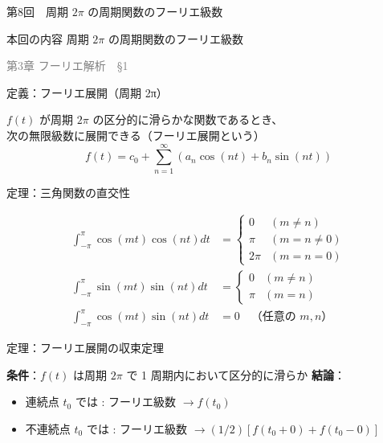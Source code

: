 \documentclass[professionalfonts]{beamer}
\begin{document}
\begin{frame}{第8回　周期 $2\pi$ の周期関数のフーリエ級数}
  \begin{block}{本回の内容}
  周期 $2\pi$ の周期関数のフーリエ級数
  \end{block}
  \vfill\hfill{\scriptsize \textcolor{gray}{第3章 フーリエ解析　§1}}
\end{frame}

\begin{frame}{定義：フーリエ展開（周期 2π）}
  \begin{block}{}
  $f(t)$ が周期 $2\pi$ の区分的に滑らかな関数であるとき、\\[2pt]
  次の無限級数に展開できる（フーリエ展開という）\\[2pt]
  \[
    f(t) = c_{0} + \sum_{n=1}^\infty (a_{n}\cos(nt) + b_{n}\sin(nt))
  \]
  \end{block}
\end{frame}

\begin{frame}{定理：三角関数の直交性}
  \begin{block}{}
  \begin{align*}
    \int_{-\pi}^{\pi} \cos(mt)\cos(nt) dt &= \begin{cases} 0 & (m \neq n) \\ \pi & (m = n \neq 0) \\ 2\pi & (m = n = 0) \end{cases} \\
    \int_{-\pi}^{\pi} \sin(mt)\sin(nt) dt &= \begin{cases} 0 & (m \neq n) \\ \pi & (m = n) \end{cases} \\
    \int_{-\pi}^{\pi} \cos(mt)\sin(nt) dt &= 0 \quad \text{（任意の $m, n$）}
  \end{align*}
  \end{block}
\end{frame}

\begin{frame}{定理：フーリエ展開の収束定理}
  \begin{block}{}
  \textbf{条件}：$f(t)$ は周期 $2\pi$ で 1 周期内において区分的に滑らか
  \textbf{結論}：
  \begin{itemize}
    \item 連続点 $t_{0}$ では : フーリエ級数 $ \to f(t_{0})$
    \item 不連続点 $t_{0}$ では : フーリエ級数 $ \to (1/2)[f(t_{0}+0) + f(t_{0}-0)]$
  \end{itemize}
  \end{block}
\end{frame}
\end{document}
